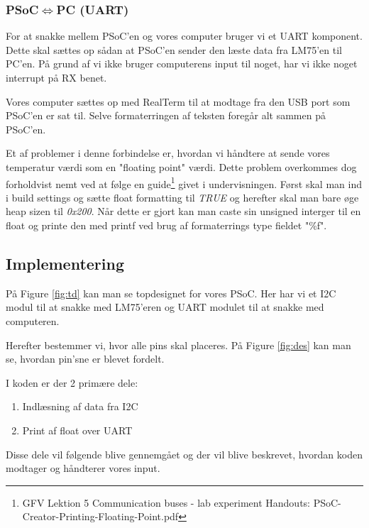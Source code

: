 \documentclass[../main.tex]{subfiles}
\begin{document}
\subsubsection{PSoC$\iff$PC (UART)}
For at snakke mellem PSoC'en og vores computer bruger vi et UART komponent. Dette skal sættes op sådan at PSoC'en sender den læste data fra LM75'en til PC'en.
På grund af vi ikke bruger computerens input til noget, har vi ikke noget interrupt på RX benet.

Vores computer sættes op med RealTerm til at modtage fra den USB port som PSoC'en er sat til.
Selve formaterringen af teksten foregår alt sammen på PSoC'en.

Et af problemer i denne forbindelse er, hvordan vi håndtere at sende vores temperatur værdi som en "floating point" værdi.
Dette problem overkommes dog forholdvist nemt ved at følge en guide\footnote{GFV Lektion 5 Communication buses - lab experiment Handouts: PSoC-Creator-Printing-Floating-Point.pdf} givet i undervisningen.
Først skal man ind i build settings og sætte float formatting til \textit{TRUE} og herefter skal man bare øge heap sizen til \textit{0x200}.
Når dette er gjort kan man caste sin unsigned interger til en float og printe den med printf ved brug af formaterrings type fieldet "\%f".

\subsection{Implementering}
På Figure \ref{fig:td} kan man se topdesignet for vores PSoC. Her har vi et I2C modul til at snakke med LM75'eren og UART modulet til at snakke med computeren.


Herefter bestemmer vi, hvor alle pins skal placeres. På Figure \ref{fig:des} kan man se, hvordan pin'sne er blevet fordelt.

I koden er der 2 primære dele:
\begin{enumerate}
    \item Indlæsning af data fra I2C
    \item Print af float over UART
\end{enumerate}
Disse dele vil følgende blive gennemgået og der vil blive beskrevet, hvordan koden modtager og håndterer vores input.
\end{document}
